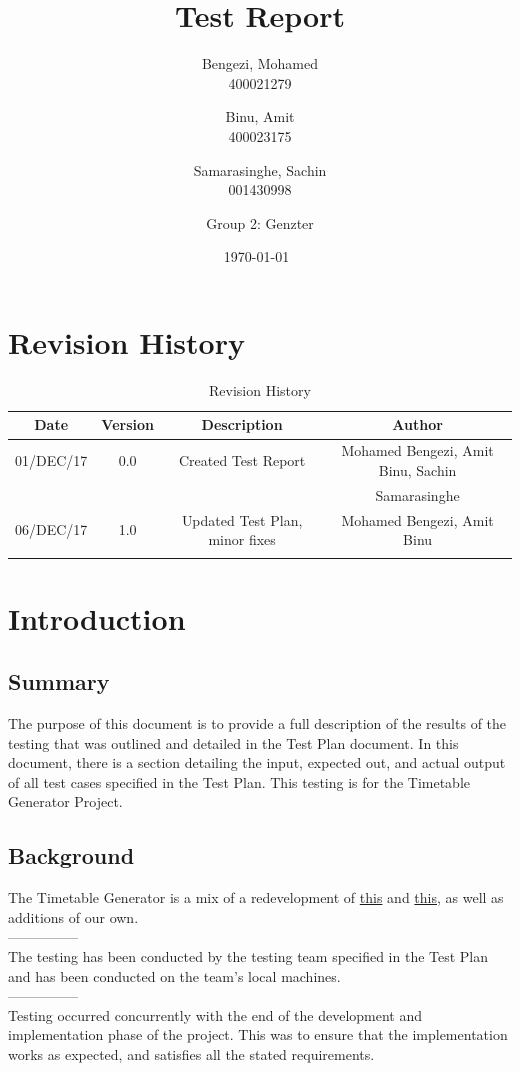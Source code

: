 \documentclass[11pt, oneside]{article}
\title{Test Report}
\author{Bengezi, Mohamed\\
		400021279
		\and
		Binu, Amit\\
		400023175
		\and
		Samarasinghe, Sachin\\
		001430998 \\
		\and
		Group 2: Genzter
		}
\date{\today\ }
\begin{document}
\maketitle
\newpage
\tableofcontents
\listoffigures
\listoftables

\newpage
\section{Revision History}
\begin{table}[h]
\begin{center}
\begin{tabular}{ | c | c | c | c | }
\hline
 \textbf{Date} & \textbf{Version} & \textbf{Description} & \textbf{Author} \\ 
\hline
  01/DEC/17 & 0.0 & Created Test Report & Mohamed Bengezi, Amit Binu, Sachin \\
  &&& Samarasinghe \\
  \hline
  06/DEC/17 & 1.0 & Updated Test Plan, minor fixes & Mohamed Bengezi, Amit Binu \\
\hline 
 & & & \\ 
\hline 
\end{tabular}
\end{center}
\caption{Revision History}
\end{table}

\newpage
\section{Introduction}
\subsection{Summary}
The purpose of this document is to provide a full description of the results of the testing that was outlined and detailed in the Test Plan document. In this document, there is a section detailing the input, expected out, and actual output of all test cases specified in the Test Plan. This testing is for the Timetable Generator Project. 

\subsection{Background}
The Timetable Generator is a mix of a redevelopment of
\href{http://timetablegenerator.io}{this} and \href{https://github.com/ash47/TimetableGenerator}{this}, as well as additions of our own.\\
---------------
\\
The testing has been conducted by the testing team specified in the Test Plan and has been conducted on the team's local machines.\\
---------------
\\
Testing occurred concurrently with the end of the development and implementation phase of the project. This was to ensure that the implementation works as expected, and satisfies all the stated requirements.
\end{document}
